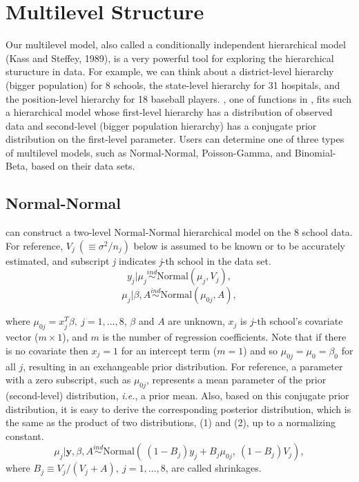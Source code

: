 \documentclass[article]{jss}
\begin{document}
\section[Multilevel Structure]{Multilevel Structure}
Our multilevel model, also called a conditionally independent hierarchical model (Kass and Steffey, 1989), is a very powerful tool for exploring the hierarchical sturucture in data. For example, we can think about a district-level hierarchy (bigger population) for 8 schools, the state-level hierarchy for 31 hospitals, and the position-level hierarchy for 18 baseball players. , one of functions in , fits such a hierarchical model whose first-level hierarchy has a distribution of observed data and second-level (bigger population hierarchy) has a conjugate prior distribution on the first-level parameter. Users can determine one of three types of multilevel models, such as Normal-Normal, Poisson-Gamma, and Binomial-Beta, based on their data sets. 
\\

 
\subsection[Normal-Normal]{Normal-Normal}
 can construct a two-level Normal-Normal hierarchical model on the 8 school data. For reference,  $V_{j}~(\equiv \sigma^{2}/n_{j})$ below is assumed to be known or to be accurately estimated, and subscript \emph{j} indicates \emph{j}-th school in the data set.
\begin{equation}
y_{j}\vert \mu_{j} \stackrel{ind}{\sim}\textrm{Normal}(\mu_{j}, V_{j}),
\end{equation}
\begin{equation}
\mu_{j}\vert \beta, A\stackrel{ind}{\sim}\textrm{Normal}(\mu_{0j}, A),
\end{equation}

where $\mu_{0j} =x^{T}_{j}\beta,~j=1, \ldots, 8$, $\beta$ and $A$ are unknown, $x_{j}$ is $j$-th school's covariate vector ($m\times 1$), and $m$ is the number of regression coefficients. Note that if there is no covariate then $x_{j}=1$ for an intercept term ($m=1$) and so $\mu_{0j}=\mu_{0}=\beta_{0}$ for all $j$, resulting in an exchangeable prior distribution. For reference, a parameter with a zero subscript, such as $\mu_{0j}$, represents a mean parameter of the prior (second-level) distribution, \emph{i.e.}, a prior mean. Also,  based on this conjugate prior distribution, it is easy to derive the corresponding posterior distribution, which is the same as the product of two distributions, (1) and (2), up to a normalizing constant.
\begin{equation}
\mu_{j}\vert \textbf{y}, \beta, A \stackrel{ind}{\sim}\textrm{Normal}(~(1-B_{j})y_{j} + B_{j}\mu_{0j},~(1-B_{j})V_{j}),
\end{equation}
where $B_{j}\equiv V_{j}/(V_{j} + A),~j=1, \ldots, 8$, are called shrinkages.
\end{document}
